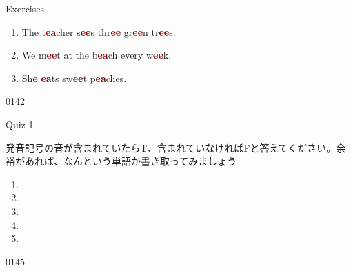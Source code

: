 \documentclass[aspectratio=169,xcolor={dvipsnames,table}]{beamer}
\begin{document}
\begin{frame}[plain]{Exercises }
\LARGE

\begin{enumerate}
 \item The t\textcolor{Maroon}{\bfseries ea}cher s\textcolor{Maroon}{\bfseries ee}s thr\textcolor{Maroon}{\bfseries ee} gr\textcolor{Maroon}{\bfseries ee}n tr\textcolor{Maroon}{\bfseries ee}s.
 \item We m\textcolor{Maroon}{\bfseries ee}t at the b\textcolor{Maroon}{\bfseries ea}ch every w\textcolor{Maroon}{\bfseries ee}k.
 \item Sh\textcolor{Maroon}{\bfseries e} \textcolor{Maroon}{\bfseries ea}ts sw\textcolor{Maroon}{\bfseries ee}t p\textcolor{Maroon}{\bfseries ea}ches.
\end{enumerate}
\hfill{\tiny 0142}\,{\scriptsize {}}

\end{frame}
\begin{frame}[plain]{Quiz 1 }

発音記号の音が含まれていたらT、含まれていなければFと答えてください。余裕があれば、なんという単語か書き取ってみましょう

\LARGE
\begin{enumerate}
 \item \mbox{}\hspace{40pt}\hspace{150pt}\mbox{}
 \item \mbox{}\hspace{40pt}\hspace{150pt}\mbox{}
 \item \mbox{}\hspace{40pt}\hspace{150pt}\mbox{}
 \item \mbox{}\hspace{40pt}\hspace{150pt}\mbox{}
 \item \mbox{}\hspace{40pt}\hspace{150pt}\mbox{}
\end{enumerate}
\hfill{\tiny 0145}\,{\scriptsize {}}

\end{frame}
\end{document}
